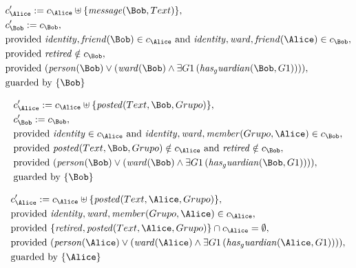 \begin{align*}
&
c'_
{
\Alice
}
 := 
c_
{
\Alice
}
 \uplus 
\{
\mathit{
message
}
(
\Bob
,
Text
)
\}
,\\
&
c'_
{
\Bob
}
 := 
c_
{
\Bob
}
,\\
&
\text{provided } 
\mathit{
identity
}
,
\mathit{
friend
}
(
\Bob
)
 \in c_
{
\Alice
}
 \text{ and } 
\mathit{
identity
}
,
\mathit{
ward
}
,
\mathit{
friend
}
(
\Alice
)
 \in c_
{
\Bob
}
,\\
&
\text{provided } 
\mathit{
retired
}
 \notin c_
{
\Bob
}
,\\
&
\text{provided } 
(
\mathit{
person
}
(
\Bob
)
\lor
(
\mathit{
ward
}
(
\Bob
)
\land
\exists 
G1
\,(
\mathit{
has_guardian
}
(
\Bob
,
G1
)
)
)
)
,\\
&
\text{guarded by } \{
\Bob
\}
\end{align*}

\begin{align*}
&
c'_
{
\Alice
}
 := 
c_
{
\Alice
}
 \uplus 
\{
\mathit{
posted
}
(
Text
,
\Bob
,
Grupo
)
\}
,\\
&
c'_
{
\Bob
}
 := 
c_
{
\Bob
}
,\\
&
\text{provided } 
\mathit{
identity
}
 \in c_
{
\Alice
}
 \text{ and } 
\mathit{
identity
}
,
\mathit{
ward
}
,
\mathit{
member
}
(
Grupo
,
\Alice
)
 \in c_
{
\Bob
}
,\\
&
\text{provided } 
\mathit{
posted
}
(
Text
,
\Bob
,
Grupo
)
 \notin c_
{
\Alice
}
 \text{ and } 
\mathit{
retired
}
 \notin c_
{
\Bob
}
,\\
&
\text{provided } 
(
\mathit{
person
}
(
\Bob
)
\lor
(
\mathit{
ward
}
(
\Bob
)
\land
\exists 
G1
\,(
\mathit{
has_guardian
}
(
\Bob
,
G1
)
)
)
)
,\\
&
\text{guarded by } \{
\Bob
\}
\end{align*}

\begin{align*}
&
c'_
{
\Alice
}
 := 
c_
{
\Alice
}
 \uplus 
\{
\mathit{
posted
}
(
Text
,
\Alice
,
Grupo
)
\}
,\\
&
\text{provided } 
\mathit{
identity
}
,
\mathit{
ward
}
,
\mathit{
member
}
(
Grupo
,
\Alice
)
 \in c_
{
\Alice
}
,\\
&
\text{provided } 
\{
\mathit{
retired
}
,
\mathit{
posted
}
(
Text
,
\Alice
,
Grupo
)
\}
 \cap c_
{
\Alice
}
 = \emptyset
,\\
&
\text{provided } 
(
\mathit{
person
}
(
\Alice
)
\lor
(
\mathit{
ward
}
(
\Alice
)
\land
\exists 
G1
\,(
\mathit{
has_guardian
}
(
\Alice
,
G1
)
)
)
)
,\\
&
\text{guarded by } \{
\Alice
\}
\end{align*}
